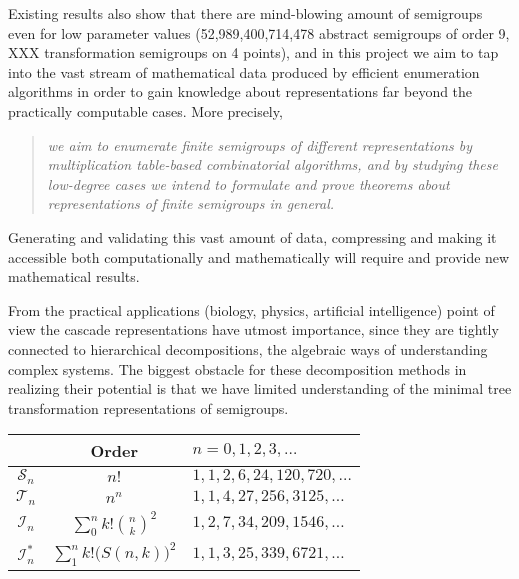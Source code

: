 \documentclass{amsart}
\newcommand{\T}{\mathcal T}
\newcommand{\I}{\mathcal I}
\newcommand{\cS}{\mathcal S}
\begin{document}
Existing results also show that there are mind-blowing amount of semigroups even for low parameter values (52,989,400,714,478 abstract semigroups of order 9, XXX transformation semigroups on 4 points), and in this project we aim to tap into the vast stream of mathematical data produced by efficient enumeration algorithms in order to gain knowledge about representations far beyond the practically computable cases.
More precisely,
\begin{quote}
\noindent\emph{we aim to enumerate finite semigroups of different representations by multiplication table-based combinatorial algorithms, and by studying these low-degree cases we intend to formulate and prove theorems about representations of finite semigroups in general.}
\end{quote}


Generating  and validating this vast amount of data, compressing and making it accessible both computationally and mathematically  will require and provide new mathematical results.    

From the practical applications (biology, physics, artificial intelligence) point of view the cascade representations have utmost importance, since they are tightly connected to hierarchical decompositions, the algebraic ways of understanding complex systems. The biggest obstacle for these decomposition methods in realizing their potential is that we have limited understanding of the minimal tree transformation representations of semigroups. 


\begin{tabular}{|c|c|l|}
\hline
 & Order & $n=0,1,2,3,\ldots$\\ 
\hline 
$\cS_n$& $n!$ & $1, 1, 2, 6, 24, 120, 720,\ldots$\\
\hline 
$\T_n$& $n^n$ & $1,1,4,27,256,3125,\ldots$\\
\hline
$\I_n$&$\sum_0^n k!{n\choose k}^2$ &$1, 2, 7, 34, 209, 1546,\ldots$\\
\hline
$\I_n^*$& $\sum_1^n k!\big(S(n, k)\big)^2$&$1, 1, 3, 25, 339, 6721,\ldots$\\
\hline
\end{tabular}
\end{document}
